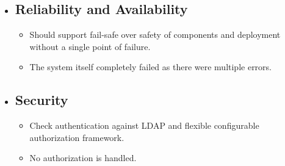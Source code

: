 \begin{itemize}
            \item \subsection{Reliability and Availability}
                \begin{itemize}
                    \item Should support fail-safe over safety of components and deployment without a single point of failure.
                    \item The system itself completely failed as there were multiple errors.
                \end{itemize}
                
            \item \subsection{Security}
                \begin{itemize}
                    \item Check authentication against LDAP and flexible configurable authorization framework.
                    \item No authorization is handled.
                \end{itemize}
                
        \end{itemize}
